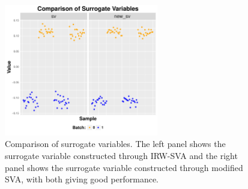 \documentclass[11pt]{article}
\begin{document}
\begin{figure}
    \centering
    \includegraphics[width = 0.6\textwidth]{figures/vector2.pdf}
    \caption{Comparison of surrogate variables. The left panel shows the surrogate variable constructed through IRW-SVA and the right panel shows the surrogate variable constructed through modified SVA, with both giving good performance.}
    \label{fig:vector2}
\end{figure}

\newpage
\clearpage



\end{document}

